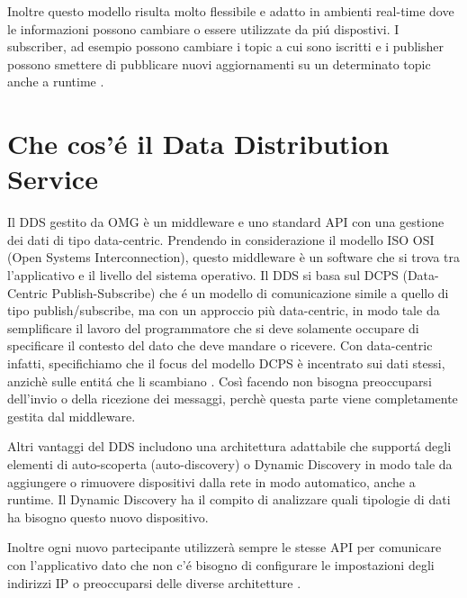 Inoltre questo modello risulta molto
flessibile e adatto in ambienti real-time dove le informazioni
possono cambiare o essere utilizzate da piú dispostivi.
I subscriber, ad esempio possono cambiare i topic a cui 
sono iscritti e i publisher possono smettere di pubblicare nuovi
aggiornamenti su un determinato topic anche a runtime \cite{OH2010318}.

\section{Che cos'é il Data Distribution Service}

Il DDS gestito da OMG è un middleware e uno standard API con una gestione
dei dati di tipo data-centric. 
Prendendo in considerazione il modello ISO OSI 
(Open Systems Interconnection), questo
middleware è un software che si trova tra l'applicativo e il livello
del sistema operativo.
Il DDS si basa sul DCPS (Data-Centric Publish-Subscribe) 
che é un modello di comunicazione simile a quello
di tipo publish/subscribe, ma con un approccio più data-centric, in modo
tale da semplificare il lavoro del programmatore che si deve solamente
occupare di specificare il contesto del dato che deve mandare o ricevere.
Con data-centric infatti, specifichiamo che il focus del modello DCPS 
è incentrato 
sui dati stessi, anzichè sulle entitá che li scambiano \cite{whatisdds}.
Così facendo non bisogna preoccuparsi dell'invio o della ricezione
dei messaggi, perchè questa parte viene completamente gestita dal middleware.


Altri vantaggi del DDS includono una architettura adattabile che supportá
degli elementi di auto-scoperta (auto-discovery) o Dynamic Discovery 
in modo tale da aggiungere o 
rimuovere dispositivi dalla rete in modo automatico, anche a runtime.
Il Dynamic Discovery ha il compito di analizzare quali tipologie di dati 
ha bisogno questo nuovo dispositivo. 

Inoltre ogni nuovo partecipante 
utilizzerà sempre le stesse API per comunicare con l'applicativo dato che 
non c'é bisogno di configurare le impostazioni degli indirizzi IP o 
preoccuparsi delle diverse architetture \cite{1494965}.
 
